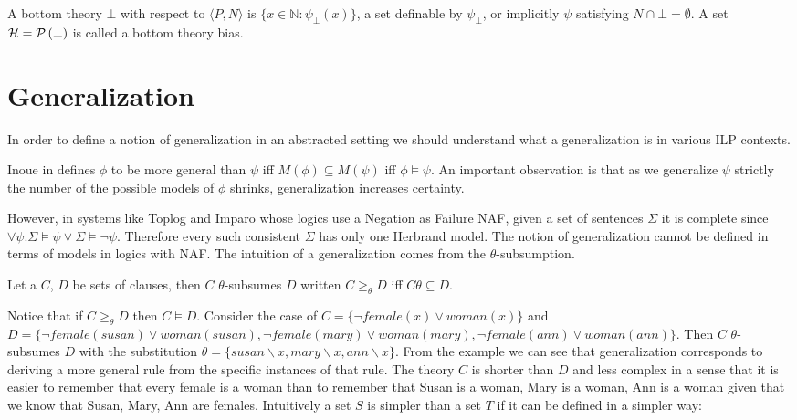\begin{defn}
A bottom theory $\bot$ with respect to $\langle P, N \rangle$ is
$\{x \in \mathbb{N} : \psi_\bot(x)\}$,
a set definable by $\psi_\bot$, or implicitly $\psi$ satisfying
$N \cap \bot = \emptyset$.
A set $\mathcal{H}=\mathcal{P} \left({ \bot }\right)$ is called a bottom theory bias.
\end{defn}

\section{Generalization}
In order to define a notion of generalization in an abstracted setting we should understand what a generalization is in various ILP contexts.

Inoue in \cite{inoue2012} defines $\phi$ to be more general than $\psi$ iff
$M(\phi) \subseteq M(\psi)$ iff $\phi \models \psi$. An important observation is that as we generalize $\psi$ strictly the number of the possible models of $\phi$ shrinks, generalization increases certainty.

However, in systems like Toplog and Imparo whose logics use a Negation as Failure NAF, given a set of sentences $\Sigma$ it is complete since
$\forall \psi. \Sigma \models \psi \vee \Sigma \models \neg\psi$. Therefore every such consistent $\Sigma$ has only one Herbrand model. The notion of generalization cannot be defined in terms of models in logics with NAF. The intuition of a generalization comes from the $\theta$-subsumption.

\begin{defn}
Let a $C$, $D$ be sets of clauses, then $C$ $\theta$-subsumes $D$  written
$C \ge_\theta D$ iff $C \theta \subseteq D$.
\end{defn}

Notice that if $C \ge_\theta D$ then $C \models D$. Consider the case of $C=\{\neg female(x) \vee woman(x)\}$ and
$D=\{
\neg female(susan) \vee woman(susan),
\neg female(mary) \vee woman(mary),
\neg female(ann) \vee woman(ann) \}$.
Then $C$ $\theta$-subsumes $D$ with the substitution
$\theta=\{susan \backslash x, mary \backslash x, ann \backslash x\}$.
From the example we can see that generalization corresponds to deriving a more general rule from the specific instances of that rule. The theory $C$ is shorter than $D$ and less complex in a sense that it is easier to remember that every female is a woman than to remember that Susan is a woman, Mary is a woman, Ann is a woman given that we know that Susan, Mary, Ann are females.
Intuitively a set $S$ is simpler than a set $T$ if it can be defined in a simpler way:

